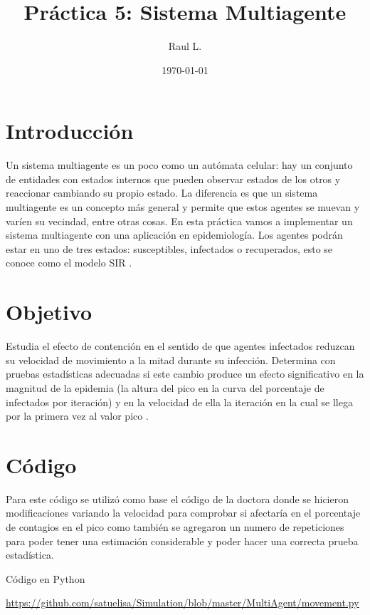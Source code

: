 \documentclass{article}
\author{Raul L.} %
\title{Pr\'{a}ctica 5: Sistema Multiagente} %
\date{\today}
\begin{document}

\maketitle %


\section{Introducci\'{o}n}\label{intro} %



Un sistema multiagente es un poco como un autómata celular: hay un conjunto de entidades con estados internos que pueden observar estados de los otros y reaccionar cambiando su propio estado. La diferencia es que un sistema multiagente es un concepto más general y permite que estos agentes se muevan y varíen su vecindad, entre otras cosas. En esta práctica vamos a implementar un sistema multiagente con una aplicación en epidemiología. Los agentes podrán estar en uno de tres estados: susceptibles, infectados o recuperados, esto se conoce como el modelo SIR  \citep{ejemplo2}.

\section{Objetivo}
Estudia el efecto de contención en el sentido de que agentes infectados reduzcan su velocidad de movimiento a la mitad durante su infección. Determina con pruebas estadísticas adecuadas si este cambio produce un efecto significativo en la magnitud de la epidemia (la altura del pico en la curva del porcentaje de infectados por iteración) y en la velocidad de ella la iteración en la cual se llega por la primera vez al valor pico \citep{ejemplo2}.

\section{C\'{o}digo}
Para este código se utilizó como base el código de la doctora donde se hicieron modificaciones variando la velocidad para comprobar si afectaría en el porcentaje de contagios en el pico como también se agregaron un numero de repeticiones para poder tener una estimación considerable y poder hacer una correcta prueba estadística.

 Código en Python 

\url{https://github.com/satuelisa/Simulation/blob/master/MultiAgent/movement.py}
\end{document}

